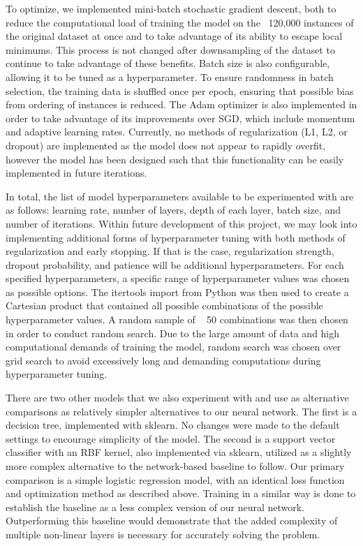 \documentclass[11pt]{article}
\begin{document}
To optimize, we implemented mini-batch stochastic gradient descent, both to reduce the computational load of training the model on the ~120,000 instances of the original dataset at once and to take advantage of its ability to escape local minimums. This process is not changed after downsampling of the dataset to continue to take advantage of these benefits. Batch size is also configurable, allowing it to be tuned as a hyperparameter. To ensure randomness in batch selection, the training data is shuffled once per epoch, ensuring that possible bias from ordering of instances is reduced. The Adam optimizer is also implemented in order to take advantage of its improvements over SGD, which include momentum and adaptive learning rates. Currently, no methods of regularization (L1, L2, or dropout) are implemented as the model does not appear to rapidly overfit, however the model has been designed such that this functionality can be easily implemented in future iterations. 

In total, the list of model hyperparameters available to be experimented with are as follows: learning rate, number of layers, depth of each layer, batch size, and number of iterations. Within future development of this project, we may look into implementing additional forms of hyperparameter tuning with both methods of regularization and early stopping. If that is the case, regularization strength, dropout probability, and patience will be additional hyperparameters.
For each specified hyperparameters, a specific range of hyperparameter values was chosen as possible options. The itertools import from Python was then used to create a Cartesian product that contained all possible combinations of the possible hyperparameter values. A random sample of ~ 50 combinations was then chosen in order to conduct random search. Due to the large amount of data and high computational demands of training the model, random search was chosen over grid search to avoid excessively long and demanding computations during hyperparameter tuning.

There are two other models that we also experiment with and use as alternative comparisons as relatively simpler alternatives to our neural network. The first is a decision tree, implemented with sklearn. No changes were made to the default settings to encourage simplicity of the model. The second is a support vector classifier with an RBF kernel, also implemented via sklearn, utilized as a slightly more complex alternative to the network-based baseline to follow. 
Our primary comparison is a simple logistic regression model, with an identical loss function and optimization method as described above. Training in a similar way is done to establish the baseline as a less complex version of our neural network. Outperforming this baseline would demonstrate that the added complexity of multiple non-linear layers is necessary for accurately solving the problem. 
\end{document}
